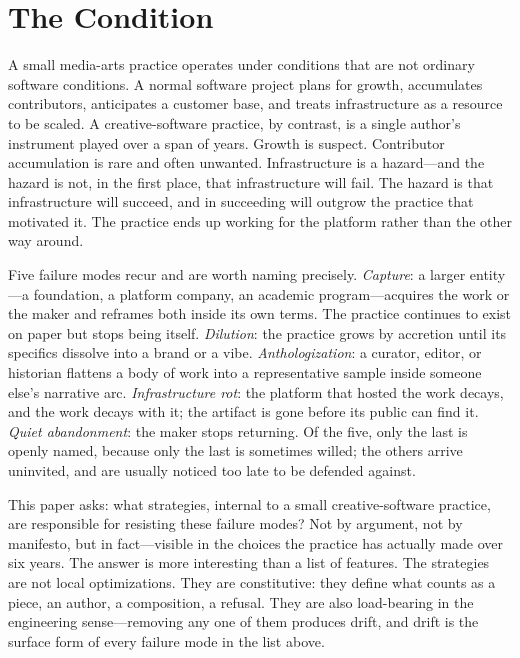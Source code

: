 \documentclass[10pt,letterpaper,twocolumn]{article}
\begin{document}
\section{The Condition}

A small media-arts practice operates under conditions that are not ordinary software conditions. A normal software project plans for growth, accumulates contributors, anticipates a customer base, and treats infrastructure as a resource to be scaled. A creative-software practice, by contrast, is a single author's instrument played over a span of years. Growth is suspect. Contributor accumulation is rare and often unwanted. Infrastructure is a hazard---and the hazard is not, in the first place, that infrastructure will fail. The hazard is that infrastructure will succeed, and in succeeding will outgrow the practice that motivated it. The practice ends up working for the platform rather than the other way around.

Five failure modes recur and are worth naming precisely. \emph{Capture}: a larger entity---a foundation, a platform company, an academic program---acquires the work or the maker and reframes both inside its own terms. The practice continues to exist on paper but stops being itself. \emph{Dilution}: the practice grows by accretion until its specifics dissolve into a brand or a vibe. \emph{Anthologization}: a curator, editor, or historian flattens a body of work into a representative sample inside someone else's narrative arc. \emph{Infrastructure rot}: the platform that hosted the work decays, and the work decays with it; the artifact is gone before its public can find it. \emph{Quiet abandonment}: the maker stops returning. Of the five, only the last is openly named, because only the last is sometimes willed; the others arrive uninvited, and are usually noticed too late to be defended against.

This paper asks: what strategies, internal to a small creative-software practice, are responsible for resisting these failure modes? Not by argument, not by manifesto, but in fact---visible in the choices the practice has actually made over six years. The answer is more interesting than a list of features. The strategies are not local optimizations. They are constitutive: they define what counts as a piece, an author, a composition, a refusal. They are also load-bearing in the engineering sense---removing any one of them produces drift, and drift is the surface form of every failure mode in the list above.
\end{document}
